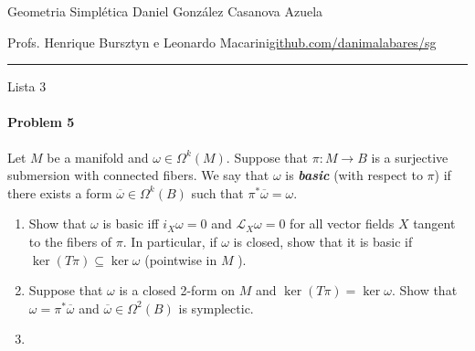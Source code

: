 
%



\begin{minipage}{\textwidth}
	\begin{minipage}{1\textwidth}
		Geometria Simpl\'etica \hfill Daniel González Casanova Azuela
		
		{\small Profs. Henrique Bursztyn e Leonardo Macarini\hfill\href{https://github.com/danimalabares/sg}{github.com/danimalabares/sg}}
	\end{minipage}
\end{minipage}\vspace{.2cm}\hrule

\vspace{10pt}
{\huge Lista 3}

\paragraph{Problem 5} Let $M$ be a manifold and $\omega\in\Omega^{k}(M)$. Suppose that $\pi:M\to B$ is a surjective submersion with connected fibers. We say that $\omega$ is \textit{\textbf{basic}} (with respect to $\pi$) if there exists a form $\overline{\omega} \in \Omega^{k}(B)$ such that $\pi^*\overline{\omega} =\omega$.
\begin{enumerate}[label=\alph*.]
	\item Show that $\omega$ is basic iff $i_X\omega=0$ and $\mathcal{L}_{X}\omega=0$ for all vector fields $X$ tangent to the fibers of $\pi$. In particular, if $\omega$ is closed, show that it is basic if $\ker(T\pi)\subseteq\ker \omega$ (pointwise in $M$ ).

		\item Suppose that $\omega$ is a closed 2-form on $M$ and $\ker(T\pi)=\ker \omega$. Show that $\omega=\pi^*\overline{\omega}$ and $\overline{\omega}\in\Omega^{2}(B)$ is symplectic.

		\item 
\end{enumerate}


